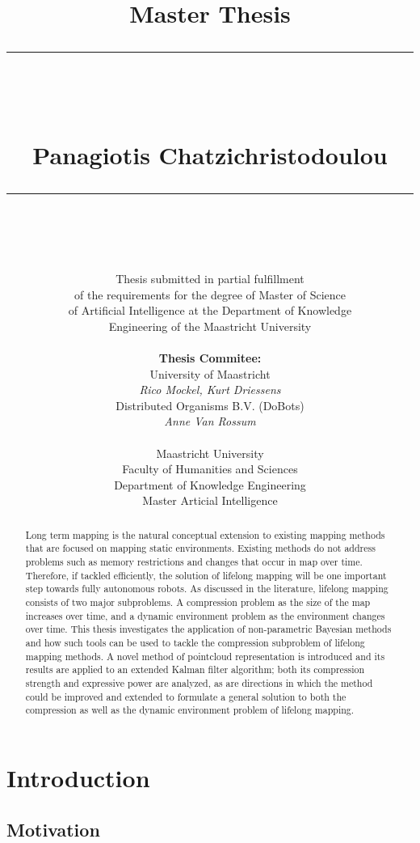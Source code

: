 \documentclass [twoside,hidelinks]{article}
\title{
\Huge{Master Thesis} \\
\noindent\rule{4cm}{0.4pt} \\
\vspace{5mm}
\huge{\selectfont{Towards lifelong mapping in pointclouds}}
\vspace{5mm} \\
\normalsize Panagiotis Chatzichristodoulou \\
\noindent\rule{4cm}{0.4pt} \\
\vspace{5mm}
\fontsize{24pt}{10pt}{Master Thesis DKE 09-16 }} %
\author{
\normalsize Thesis submitted in partial fulfillment\\
\normalsize  of the requirements for the degree of Master of Science \\
\normalsize of Artificial Intelligence at the Department of Knowledge \\
\normalsize  Engineering of the Maastricht University \\
\vspace{5mm} \\
\normalsize \textbf{Thesis Commitee:} \\ 
\normalsize University of Maastricht \\ %
\normalsize \textit{Rico Mockel, Kurt Driessens} \\
\normalsize Distributed Organisms B.V. (DoBots)\\
\normalsize \textit{Anne Van Rossum} \\
\vspace{0mm} \\
\normalsize Maastricht University \\
\normalsize Faculty of Humanities and Sciences \\ 
\normalsize Department of Knowledge Engineering \\
\normalsize Master Articial Intelligence \\
}
\begin{document}
\maketitle %

\thispagestyle{fancy} %

\newpage
\begin{abstract}

\noindent Long term mapping is the natural conceptual extension to existing mapping methods that are focused on mapping static environments.
Existing methods do not address problems such as memory restrictions and changes that occur in map over time. Therefore, if tackled efficiently, the solution of lifelong mapping will be one important step towards fully autonomous robots.
As discussed in the literature, lifelong mapping consists of two major subproblems. A compression problem as the size of the map increases over time, and a dynamic environment problem as the environment changes over time. This thesis investigates the application of non-parametric Bayesian methods and how such tools can be used to tackle the compression subproblem of lifelong mapping methods. A novel method of pointcloud representation is introduced and its results are applied to an extended Kalman filter algorithm; both its compression strength and expressive power are analyzed, as are directions in which the method could be improved and extended to formulate a general solution to both the compression as well as the dynamic environment problem of lifelong mapping.


\end{abstract}

 
\tableofcontents
\listoffigures
 
 

\newpage


\section{Introduction}
\label{sec:Intro}

\subsection{Motivation}
\end{document}
